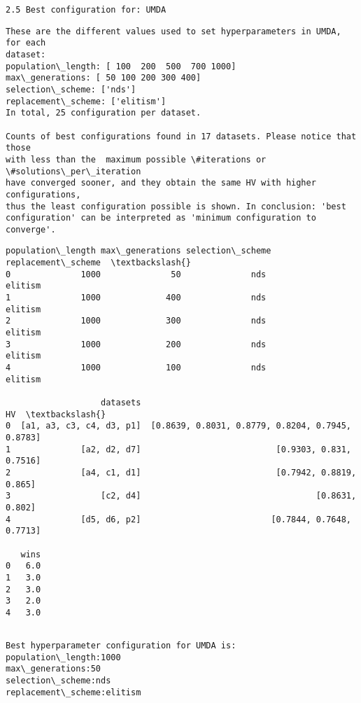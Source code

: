 \documentclass[11pt]{article}
\begin{document}
    

    \begin{verbatim}
2.5 Best configuration for: UMDA
\end{verbatim}

    \begin{Verbatim}[commandchars=\\\{\}]
These are the different values used to set hyperparameters in UMDA, for each
dataset:
population\_length: [ 100  200  500  700 1000]
max\_generations: [ 50 100 200 300 400]
selection\_scheme: ['nds']
replacement\_scheme: ['elitism']
In total, 25 configuration per dataset.

Counts of best configurations found in 17 datasets. Please notice that those
with less than the  maximum possible \#iterations or \#solutions\_per\_iteration
have converged sooner, and they obtain the same HV with higher configurations,
thus the least configuration possible is shown. In conclusion: 'best
configuration' can be interpreted as 'minimum configuration to converge'.
    \end{Verbatim}

    
    \begin{Verbatim}[commandchars=\\\{\}]
  population\_length max\_generations selection\_scheme replacement\_scheme  \textbackslash{}
0              1000              50              nds            elitism   
1              1000             400              nds            elitism   
2              1000             300              nds            elitism   
3              1000             200              nds            elitism   
4              1000             100              nds            elitism   

                   datasets                                                HV  \textbackslash{}
0  [a1, a3, c3, c4, d3, p1]  [0.8639, 0.8031, 0.8779, 0.8204, 0.7945, 0.8783]   
1              [a2, d2, d7]                           [0.9303, 0.831, 0.7516]   
2              [a4, c1, d1]                           [0.7942, 0.8819, 0.865]   
3                  [c2, d4]                                   [0.8631, 0.802]   
4              [d5, d6, p2]                          [0.7844, 0.7648, 0.7713]   

   wins  
0   6.0  
1   3.0  
2   3.0  
3   2.0  
4   3.0  
    \end{Verbatim}

    
    \begin{Verbatim}[commandchars=\\\{\}]

Best hyperparameter configuration for UMDA is:
population\_length:1000
max\_generations:50
selection\_scheme:nds
replacement\_scheme:elitism
    \end{Verbatim}
\end{document}

